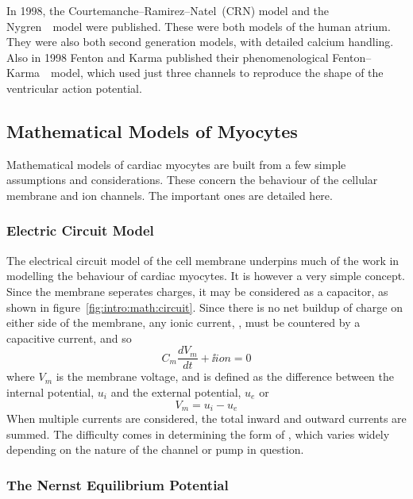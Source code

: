 In 1998, the Courtemanche--Ramirez--Natel\cite{CRN1998}\ (CRN) model and the
Nygren~\cite{Nygren1998}\ model were published.
These were both models of the human atrium.
They were also both second generation models, with detailed calcium handling.
Also in 1998 Fenton and Karma published their phenomenological
Fenton--Karma~\cite{Fenton1998}\ model, which used just three channels to
reproduce the shape of the ventricular action potential.

\subsection{Mathematical Models of Myocytes}

Mathematical models of cardiac myocytes are built from a few simple assumptions
and considerations.
These concern the behaviour of the cellular membrane and ion channels.
The important ones are detailed here.

\subsubsection{Electric Circuit Model}

The electrical circuit model of the cell membrane underpins much of the work in
modelling the behaviour of cardiac myocytes.
It is however a very simple concept.
Since the membrane seperates charges, it may be considered as a capacitor, as
shown in figure~\ref{fig:intro:math:circuit}.
Since there is no net buildup of
charge on either side of the membrane, any ionic current, , must be
countered by a capacitive current, and so
\begin{equation}
C_{m}\frac{dV_{m}}{dt} + \ii{ion} = 0
\label{eqn:intro:math:basic}
\end{equation}
where $V_{m}$ is the membrane voltage, and is defined as the difference between
the internal potential, $u_{i}$ and the external potential, $u_{e}$ or
\begin{equation}
V_{m} = u_{i} - u_{e}
\label{eqn:intro:math:vm}
\end{equation}
When multiple currents are considered, the total inward and outward currents are
summed.
The difficulty comes in determining the form of , which varies widely
depending on the nature of the channel or pump in question.

\subsubsection{The Nernst Equilibrium Potential}

